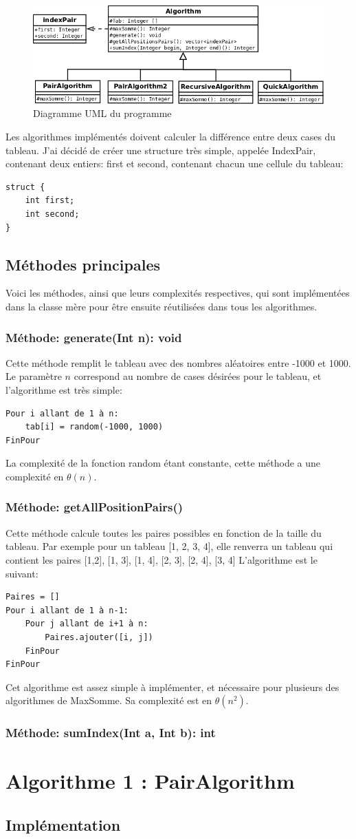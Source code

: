 \documentclass[a4paper, 12pt]{article}
\begin{document}
\begin{figure}[h]
	\centering
	\includegraphics[scale=0.3]{diagramme.png}
	\caption{Diagramme UML du programme}
	\label{uml}	
\end{figure}

 
Les algorithmes implémentés doivent calculer la différence entre deux cases du tableau. J'ai décidé de créer une structure très simple, appelée IndexPair, contenant deux entiers: first et second, contenant chacun une cellule du tableau:
\begin{verbatim}
struct {
    int first;
    int second;
}
\end{verbatim}

\subsection{Méthodes principales}
Voici les méthodes, ainsi que leurs complexités respectives, qui sont implémentées dans la classe mère pour être ensuite réutilisées dans tous les algorithmes.
\subsubsection{Méthode: generate(Int n): void}
Cette méthode remplit le tableau avec des nombres aléatoires entre -1000 et 1000. Le paramètre $n$ correspond au nombre de cases désirées pour le tableau, et l'algorithme est très simple:
\begin{verbatim}
Pour i allant de 1 à n:
    tab[i] = random(-1000, 1000)
FinPour
\end{verbatim}
La complexité de la fonction random étant constante, cette méthode a une complexité en $\theta (n)$.

\subsubsection{Méthode: getAllPositionPairs()}
Cette méthode calcule toutes les paires possibles en fonction de la taille du tableau. Par exemple pour un tableau [1, 2, 3, 4], elle renverra un tableau qui contient les paires {[1,2], [1, 3], [1, 4], [2, 3], [2, 4], [3, 4]}
L'algorithme est le suivant:
\begin{verbatim}
Paires = []
Pour i allant de 1 à n-1:
    Pour j allant de i+1 à n:
        Paires.ajouter([i, j])
    FinPour
FinPour
\end{verbatim}
Cet algorithme est assez simple à implémenter, et nécessaire pour plusieurs des algorithmes de MaxSomme. Sa complexité est en $\theta (n^2)$.
\subsubsection{Méthode: sumIndex(Int a, Int b): int}
\section{Algorithme 1 : PairAlgorithm}
\subsection{Implémentation}
\end{document}
